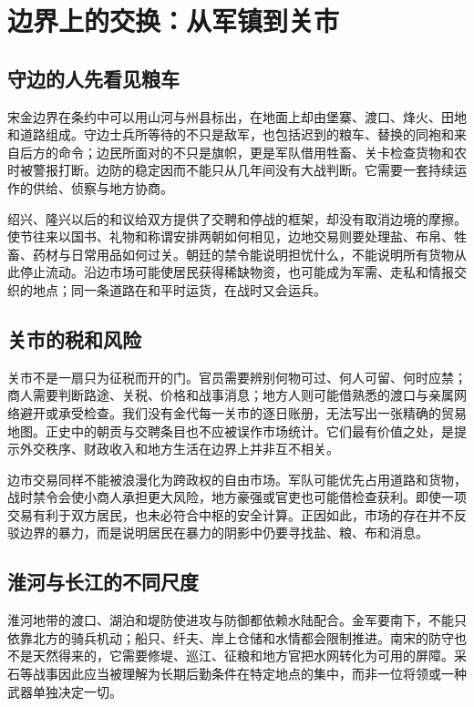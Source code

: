 \section{边界上的交换：从军镇到关市}

\subsection{守边的人先看见粮车}

宋金边界在条约中可以用山河与州县标出，在地面上却由堡寨、渡口、烽火、田地和道路组成。守边士兵所等待的不只是敌军，也包括迟到的粮车、替换的同袍和来自后方的命令；边民所面对的不只是旗帜，更是军队借用牲畜、关卡检查货物和农时被警报打断。边防的稳定因而不能只从几年间没有大战判断。它需要一套持续运作的供给、侦察与地方协商。

绍兴、隆兴以后的和议给双方提供了交聘和停战的框架，却没有取消边境的摩擦。使节往来以国书、礼物和称谓安排两朝如何相见，边地交易则要处理盐、布帛、牲畜、药材与日常用品如何过关。朝廷的禁令能说明担忧什么，不能说明所有货物从此停止流动。沿边市场可能使居民获得稀缺物资，也可能成为军需、走私和情报交织的地点；同一条道路在和平时运货，在战时又会运兵。

\subsection{关市的税和风险}

关市不是一扇只为征税而开的门。官员需要辨别何物可过、何人可留、何时应禁；商人需要判断路途、关税、价格和战事消息；地方人则可能借熟悉的渡口与亲属网络避开或承受检查。我们没有金代每一关市的逐日账册，无法写出一张精确的贸易地图。正史中的朝贡与交聘条目也不应被误作市场统计。它们最有价值之处，是提示外交秩序、财政收入和地方生活在边界上并非互不相关。

边市交易同样不能被浪漫化为跨政权的自由市场。军队可能优先占用道路和货物，战时禁令会使小商人承担更大风险，地方豪强或官吏也可能借检查获利。即使一项交易有利于双方居民，也未必符合中枢的安全计算。正因如此，市场的存在并不反驳边界的暴力，而是说明居民在暴力的阴影中仍要寻找盐、粮、布和消息。

\subsection{淮河与长江的不同尺度}

淮河地带的渡口、湖泊和堤防使进攻与防御都依赖水陆配合。金军要南下，不能只依靠北方的骑兵机动；船只、纤夫、岸上仓储和水情都会限制推进。南宋的防守也不是天然得来的，它需要修堤、巡江、征粮和地方官把水网转化为可用的屏障。采石等战事因此应当被理解为长期后勤条件在特定地点的集中，而非一位将领或一种武器单独决定一切。

